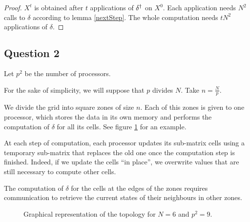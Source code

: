 \begin{proof}
 $X^t$ is obtained after $t$ applications of $\delta^{\dag}$ on $X^0$. Each application needs $N^2$ calls to $\delta$ according to lemma \ref{nextStep}. The whole computation needs $tN^2$ applications of $\delta$.
\end{proof}


\subsection*{Question 2}

Let $p^2$ be the number of processors.

For the sake of simplicity, we will suppose that $p$ divides $N$. Take $n = \frac{N}{p}$.

We divide the grid into square zones of size $n$. Each of this zones is given to one processor, which stores the data in its own memory and performs the computation of $\delta$ for all its cells. See figure \ref{q2:draw} for an example.

At each step of computation, each processor updates its sub-matrix cells using a temporary sub-matrix that replaces the old one once the computation step is finished. Indeed,  if we update the cells ``in place'', we overwrite values that are still necessary to compute other cells.

The computation of $\delta$ for the cells at the edges of the zones requires communication to retrieve the current states of their neighbours in other zones.

\begin{figure}
\caption{Graphical representation of the topology for $N=6$ and $p^2=9$.}
\label{q2:draw}
\begin{center}
\end{center}
\end{figure}

